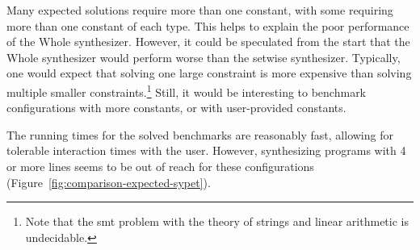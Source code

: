Many expected solutions require more than one constant, with some requiring more
than one constant of each type.
This helps to explain the poor performance of the Whole synthesizer.
However, it could be speculated from the start that the Whole synthesizer would
perform worse than the setwise synthesizer.
Typically, one would expect that solving one large constraint is more expensive
than solving multiple smaller constraints.\footnote{Note that the \gls{smt}
problem with the theory of strings and linear arithmetic is undecidable.}
Still, it would be interesting to benchmark configurations with more
constants, or with user-provided constants.

The running times for the solved benchmarks are reasonably fast, allowing for
tolerable interaction times with the user.
However, synthesizing programs with 4 or more lines seems to be out of reach for
these configurations (Figure~\ref{fig:comparison-expected-sypet}).
